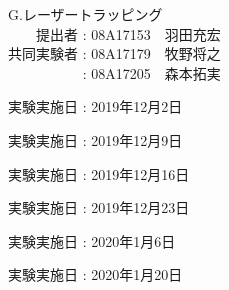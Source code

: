 \documentclass[11pt, a4paper,twocolumn]{jarticle}
\begin{document}
\begin{titlepage}
  \begin{center}
    {\Huge G.レーザートラッピング}\\
    \vspace{30truept}
    {\huge 　　提出者 : 08A17153　羽田充宏}\\ %
    {\huge 共同実験者 : 08A17179　牧野将之}\\
    {\huge 　　　　　 : 08A17205　森本拓実}\\ %
    \vspace{50truept}

    \begin{list}{}{\setlength{\leftmargin}{95pt}}
    \item {\huge 実験実施日 : 2019年12月2日}\\
    \vspace{10truept}
    \item {\huge 実験実施日 : 2019年12月9日}\\
    \vspace{10truept}
    \item {\huge 実験実施日 : 2019年12月16日}\\
    \vspace{10truept}
    \item {\huge 実験実施日 : 2019年12月23日}\\
    \vspace{10truept}
    \item {\huge 実験実施日 : 2020年1月6日}\\
    \vspace{10truept}
    \item {\huge 実験実施日 : 2020年1月20日}\\
    \vspace{40truept}

    \end{list}
    \vspace{50truept}

  \end{center}
\end{titlepage}
\end{document}
